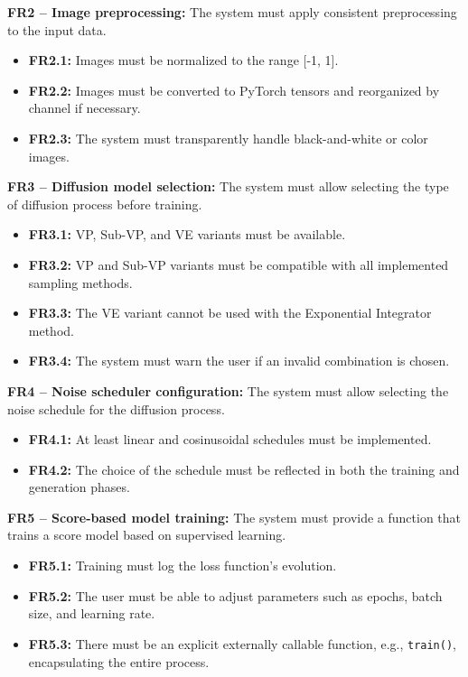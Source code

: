 \documentclass[11pt,a4paper]{article}
\begin{document}
\textbf{FR2 – Image preprocessing:} The system must apply consistent preprocessing to the input data.
\begin{itemize}
    \item \textbf{FR2.1:} Images must be normalized to the range [-1, 1].
    \item \textbf{FR2.2:} Images must be converted to PyTorch tensors and reorganized by channel if necessary.
    \item \textbf{FR2.3:} The system must transparently handle black-and-white or color images.
\end{itemize}

\textbf{FR3 – Diffusion model selection:} The system must allow selecting the type of diffusion process before training.
\begin{itemize}
    \item \textbf{FR3.1:} VP, Sub-VP, and VE variants must be available.
    \item \textbf{FR3.2:} VP and Sub-VP variants must be compatible with all implemented sampling methods.
    \item \textbf{FR3.3:} The VE variant cannot be used with the Exponential Integrator method.
    \item \textbf{FR3.4:} The system must warn the user if an invalid combination is chosen.
\end{itemize}

\textbf{FR4 – Noise scheduler configuration:} The system must allow selecting the noise schedule for the diffusion process.
\begin{itemize}
    \item \textbf{FR4.1:} At least linear and cosinusoidal schedules must be implemented.
    \item \textbf{FR4.2:} The choice of the schedule must be reflected in both the training and generation phases.
\end{itemize}

\textbf{FR5 – Score-based model training:} The system must provide a function that trains a score model based on supervised learning.
\begin{itemize}
    \item \textbf{FR5.1:} Training must log the loss function's evolution.
    \item \textbf{FR5.2:} The user must be able to adjust parameters such as epochs, batch size, and learning rate.
    \item \textbf{FR5.3:} There must be an explicit externally callable function, e.g., \texttt{train()}, encapsulating the entire process.
\end{itemize}
\end{document}
